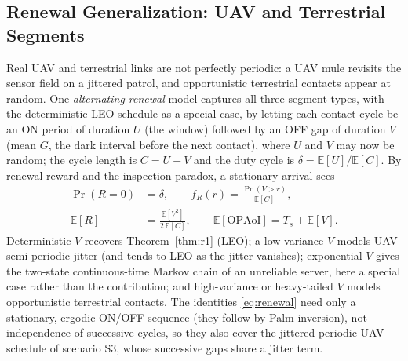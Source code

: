 \documentclass[twocolumn,3p,times,procedia]{elsarticle}
\theoremstyle{plain}
\theoremstyle{remark}
\newcommand{\OPAoI}{\mathrm{OPAoI}}
\newcommand{\E}{\mathbb{E}}
\begin{document}
\subsection{Renewal Generalization: UAV and Terrestrial
Segments}\label{sec:renewal}
Real UAV and terrestrial links are not perfectly periodic: a UAV mule
revisits the sensor field on a jittered patrol, and opportunistic
terrestrial contacts appear at random. One \emph{alternating-renewal}
model captures all three segment types, with the deterministic LEO
schedule as a special case, by letting each contact cycle be an ON
period of duration $U$ (the window) followed by an OFF gap of duration
$V$ (mean $G$, the dark interval before the next contact), where $U$ and
$V$ may now be random; the cycle length is $C=U+V$ and the duty cycle is
$\delta=\mathbb E[U]/\mathbb E[C]$. By renewal-reward and the inspection
paradox, a stationary arrival sees
\begin{equation}\label{eq:renewal}
\begin{aligned}
\Pr(R{=}0)&=\delta,\qquad f_R(r)=\frac{\Pr(V>r)}{\mathbb E[C]},\\
\E[R]&=\frac{\E[V^2]}{2\,\E[C]},\qquad \E[\OPAoI]=T_s+\E[V].
\end{aligned}
\end{equation}
Deterministic $V$ recovers Theorem~\ref{thm:r1} (LEO); a low-variance $V$
models UAV semi-periodic jitter (and tends to LEO as the jitter
vanishes); exponential $V$ gives the two-state continuous-time Markov
chain of an unreliable server, here a special case rather than the
contribution; and high-variance or heavy-tailed $V$ models opportunistic
terrestrial contacts. The identities \eqref{eq:renewal}
need only a stationary, ergodic ON/OFF sequence (they follow by Palm
inversion), not independence of successive cycles, so they also cover
the jittered-periodic UAV schedule of scenario S3, whose successive gaps
share a jitter term.
\end{document}
